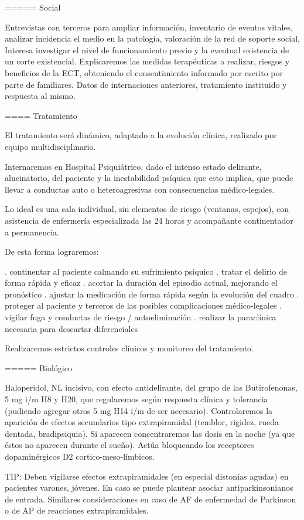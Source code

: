===== Social

Entrevistas con terceros para ampliar información, inventario de eventos vitales, analizar incidencia el medio en la patología, valoración de la red de soporte social, Interesa investigar el nivel de funcionamiento previo y la eventual existencia de un corte existencial. Explicaremos las medidas terapéuticas a realizar, riesgos y beneficios de la ECT, obteniendo el consentimiento informado por escrito por parte de familiares. Datos de internaciones anteriores, tratamiento instituido y respuesta al mismo.

==== Tratamiento

El tratamiento será dinámico, adaptado a la evolución clínica, realizado por equipo multidisciplinario.

Internaremos en Hospital Psiquiátrico, dado el intenso estado delirante, alucinatorio, del paciente y la inestabilidad psíquica que esto implica, que puede llevar a conductas auto o heteroagresivas con consecuencias médico-legales.

Lo ideal es una sala individual, sin elementos de riesgo (ventanas, espejos), con asistencia de enfermería especializada las 24 horas y acompañante continentador a permanencia.

De esta forma lograremos:

. continentar al paciente calmando su sufrimiento psíquico
. tratar el delirio de forma rápida y eficaz
. acortar la duración del episodio actual, mejorando el pronóstico
. ajustar la medicación de forma rápida según la evolución del cuadro
. proteger al paciente y terceros de las posibles complicaciones médico-legales
. vigilar fuga y conductas de riesgo / autoeliminación
. realizar la paraclínica necesaria para descartar diferenciales

Realizaremos estrictos controles clínicos y monitoreo del tratamiento.

===== Biológico

Haloperidol, NL incisivo, con efecto antidelirante, del grupo de las Butirofenonas, 5 mg i/m H8 y H20, que regularemos según respuesta clínica y tolerancia (pudiendo agregar otros 5 mg H14 i/m de ser necesario). Controlaremos la aparición de efectos secundarios tipo extrapiramidal (temblor, rigidez, rueda dentada, bradipsiquia). Si aparecen concentraremos las dosis en la noche (ya que éstos no aparecen durante el sueño).
Actúa bloqueando los receptores dopaminérgicos D2 cortico-meso-límbicos.

TIP: Deben vigilarse efectos extrapiramidales (en especial distonías agudas) en pacientes varones, jóvenes. En caso se puede plantear asociar antiparkinsonianos de entrada. Similares consideraciones en caso de AF de enfermedad de Parkinson o de AP de reacciones extrapiramidales.

